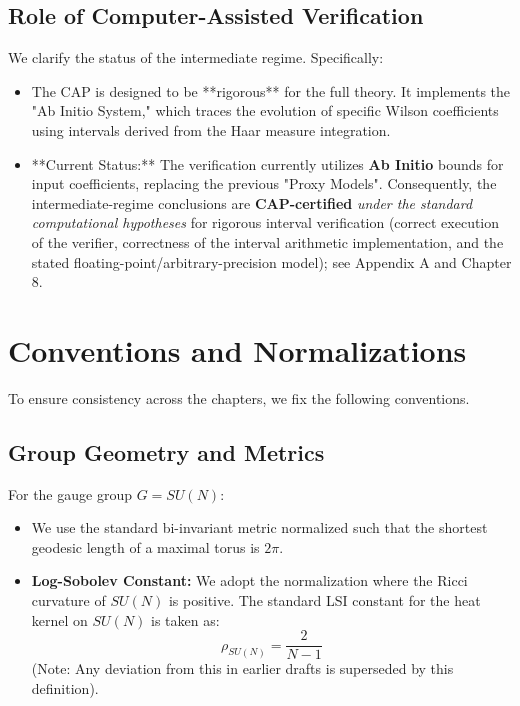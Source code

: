 \subsection{Role of Computer-Assisted Verification}
We clarify the status of the intermediate regime. 
Specifically:
\begin{itemize}
    \item The CAP is designed to be **rigorous** for the full theory. It implements the "Ab Initio System," which traces the evolution of specific Wilson coefficients using intervals derived from the Haar measure integration.
    \item **Current Status:** The verification currently utilizes \textbf{Ab Initio} bounds for input coefficients, replacing the previous "Proxy Models". Consequently, the intermediate-regime conclusions are \textbf{CAP-certified} \emph{under the standard computational hypotheses} for rigorous interval verification (correct execution of the verifier, correctness of the interval arithmetic implementation, and the stated floating-point/arbitrary-precision model); see Appendix A and Chapter 8.
\end{itemize}

\section{Conventions and Normalizations}

To ensure consistency across the chapters, we fix the following conventions.

\subsection{Group Geometry and Metrics}
For the gauge group $G=SU(N)$:
\begin{itemize}
    \item We use the standard bi-invariant metric normalized such that the shortest geodesic length of a maximal torus is $2\pi$.
    \item \textbf{Log-Sobolev Constant:} We adopt the normalization where the Ricci curvature of $SU(N)$ is positive. The standard LSI constant for the heat kernel on $SU(N)$ is taken as:
    \begin{equation}
        \rho_{SU(N)} = \frac{2}{N-1}
    \end{equation}
    (Note: Any deviation from this in earlier drafts is superseded by this definition).
\end{itemize}

